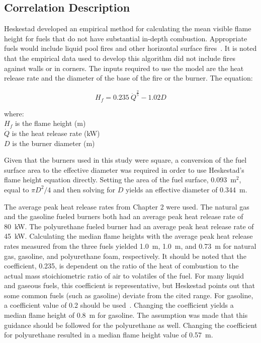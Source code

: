 \documentclass[twoside]{uocthesis}
\begin{document}
{\subsection{Correlation Description}

Heskestad developed an empirical method for calculating the mean visible flame height for fuels that do not have substantial in-depth combustion.  Appropriate fuels would include liquid pool fires and other horizontal surface fires~\cite{Heskestad:SFPE,Beyler:1986}.  It is noted that the empirical data used to develop this algorithm did not include fires against walls or in corners.  The inputs required to use the model are the heat release rate and the diameter of the base of the fire or the burner.  The equation:

\begin{equation}\label{eq:flame_height}
H_f = 0.235\: \dot{Q}^{\frac{2}{5}} - 1.02 D
\end{equation}

\begin{tabbing}
where: \=  \\
{}
\> $H_{f}$ is the flame height (m)\\
\> $\dot{Q}$ is the heat release rate (kW) \\ 
\> $D$ is the burner diameter (m) \\
\end{tabbing}

Given that the burners used in this study were square, a conversion of the fuel surface area to the effective diameter was required in order to use Heskestad's flame height equation directly.  Setting the area of the fuel surface, 0.093~m$^2$, equal to $\pi D^2/4$ and then solving for $D$ yields an effective diameter of 0.344~m.

The average peak heat release rates from Chapter 2 were used.  The natural gas and the gasoline fueled burners both had an average peak heat release rate of 80~kW.  The polyurethane fueled burner had an average peak heat release rate of 45~kW.  Calculating the median flame heights with the average peak heat release rates measured from the three fuels yielded 1.0~m, 1.0~m, and 0.73~m for natural gas, gasoline, and polyurethane foam, respectively. It should be noted that the coefficient, 0.235, is dependent on the ratio of the heat of combustion to the actual mass stoichiometric ratio of air to volatiles of the fuel.  For many liquid and gaseous fuels, this coefficient is representative, but Heskestad points out that some common fuels (such as gasoline) deviate from the cited range. For gasoline, a coefficient value of 0.2 should be used~\cite{Heskestad:SFPE}. Changing the coefficient yields a median flame height of 0.8~m for gasoline.  The assumption was made that this guidance should be followed for the polyurethane as well. Changing the coefficient for polyurethane resulted in a median flame height value of 0.57~m. 

}
\end{document}
